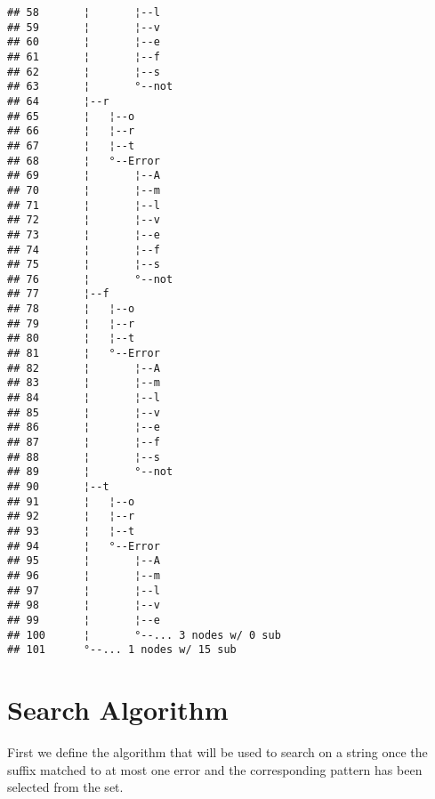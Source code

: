 \documentclass[]{article}
\begin{document}
\begin{verbatim}
## 58       ¦       ¦--l                   
## 59       ¦       ¦--v                   
## 60       ¦       ¦--e                   
## 61       ¦       ¦--f                   
## 62       ¦       ¦--s                   
## 63       ¦       °--not                 
## 64       ¦--r                           
## 65       ¦   ¦--o                       
## 66       ¦   ¦--r                       
## 67       ¦   ¦--t                       
## 68       ¦   °--Error                   
## 69       ¦       ¦--A                   
## 70       ¦       ¦--m                   
## 71       ¦       ¦--l                   
## 72       ¦       ¦--v                   
## 73       ¦       ¦--e                   
## 74       ¦       ¦--f                   
## 75       ¦       ¦--s                   
## 76       ¦       °--not                 
## 77       ¦--f                           
## 78       ¦   ¦--o                       
## 79       ¦   ¦--r                       
## 80       ¦   ¦--t                       
## 81       ¦   °--Error                   
## 82       ¦       ¦--A                   
## 83       ¦       ¦--m                   
## 84       ¦       ¦--l                   
## 85       ¦       ¦--v                   
## 86       ¦       ¦--e                   
## 87       ¦       ¦--f                   
## 88       ¦       ¦--s                   
## 89       ¦       °--not                 
## 90       ¦--t                           
## 91       ¦   ¦--o                       
## 92       ¦   ¦--r                       
## 93       ¦   ¦--t                       
## 94       ¦   °--Error                   
## 95       ¦       ¦--A                   
## 96       ¦       ¦--m                   
## 97       ¦       ¦--l                   
## 98       ¦       ¦--v                   
## 99       ¦       ¦--e                   
## 100      ¦       °--... 3 nodes w/ 0 sub
## 101      °--... 1 nodes w/ 15 sub
\end{verbatim}

\section{Search Algorithm}\label{search-algorithm}

First we define the algorithm that will be used to search on a string
once the suffix matched to at most one error and the corresponding
pattern has been selected from the set.
\end{document}

